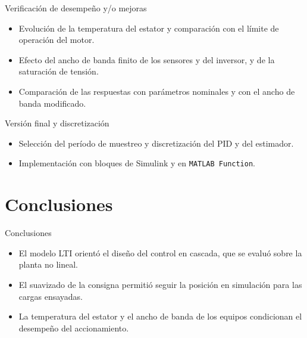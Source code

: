 \documentclass{beamer}
\newif\ifreferencias
\begin{document}
\begin{frame}{Verificación de desempeño y/o mejoras}
  \begin{itemize}
    \item Evolución de la temperatura del estator y comparación con el límite de operación del motor.
    \item Efecto del ancho de banda finito de los sensores y del inversor, y de la saturación de tensión.
    \item Comparación de las respuestas con parámetros nominales y con el ancho de banda modificado.
  \end{itemize}
\end{frame}

\begin{frame}{Versión final y discretización}
  \begin{itemize}
    \item Selección del período de muestreo y discretización del PID y del estimador.
    \item Implementación con bloques de Simulink y en \texttt{MATLAB Function}.
  \end{itemize}
\end{frame}

\section{Conclusiones}

\begin{frame}{Conclusiones}
  \begin{itemize}
    \item El modelo LTI orientó el diseño del control en cascada, que se evaluó sobre la planta no lineal.
    \item El suavizado de la consigna permitió seguir la posición en simulación para las cargas ensayadas.
    \item La temperatura del estator y el ancho de banda de los equipos condicionan el desempeño del accionamiento.
  \end{itemize}
\end{frame}

\ifreferencias
\begin{frame}[allowframebreaks]{Referencias}
  
  
\end{frame}
\fi
\end{document}
